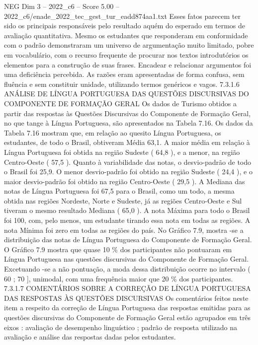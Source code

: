 \begin{textsample}{NEG Dim 3 – 2022\_c6 – Score 5.00 – 2022\_c6/enade\_2022\_tec\_gest\_tur\_eadd874aa1.txt}
Esses fatos parecem ter sido os principais responsáveis pelo resultado aquém do esperado em termos de avaliação quantitativa.
Mesmo os estudantes que responderam em conformidade com o padrão demonstraram um universo de argumentação muito limitado, pobre em vocabulário, com o recurso frequente de procurar nos textos introdutórios os elementos para a construção de suas frases.
Encadear e relacionar argumentos foi uma deficiência percebida.
As razões eram apresentadas de forma confusa, sem fluência e sem constituir unidade, utilizando termos genéricos e vagos. 7.3.1.6 ANÁLISE DE LÍNGUA PORTUGUESA DAS QUESTÕES DISCURSIVAS DO COMPONENTE DE FORMAÇÃO GERAL Os dados de Turismo obtidos a partir das respostas às Questões Discursivas do Componente de Formação Geral, no que tange à Língua Portuguesa, são apresentados na Tabela 7.16.
Os dados da Tabela 7.16 mostram que, em relação ao quesito Língua Portuguesa, os estudantes, de todo o Brasil, obtiveram Média 63,1.
A maior média em relação à Língua Portuguesa foi obtida na região Sudeste ( 64,8 ), e a menor, na região Centro-Oeste ( 57,5 ).
Quanto à variabilidade das notas, o desvio-padrão de todo o Brasil foi 25,9.
O menor desvio-padrão foi obtido na região Sudeste ( 24,4 ), e o maior desvio-padrão foi obtido na região Centro-Oeste ( 29,5 ).
A Mediana das notas de Língua Portuguesa foi 67,5 para o Brasil, como um todo, a mesma obtida nas regiões Nordeste, Norte e Sudeste, já as regiões Centro-Oeste e Sul tiveram o mesmo resultado Mediana ( 65,0 ).
A nota Máxima para todo o Brasil foi 100, com, pelo menos, um estudante tirando essa nota em todas as regiões.
A nota Mínima foi zero em todas as regiões do país.
No Gráfico 7.9, mostra -se a distribuição das notas de Língua Portuguesa do Componente de Formação Geral.
O Gráfico 7.9 mostra que quase 10 \% dos participantes não pontuaram em Língua Portuguesa nas questões discursivas do Componente de Formação Geral.
Excetuando -se a não pontuação, a moda dessa distribuição ocorre no intervalo ( 60 ; 70 ], unimodal, com uma frequência maior que 20 \% dos participantes. 7.3.1.7 COMENTÁRIOS SOBRE A CORREÇÃO DE LÍNGUA PORTUGUESA DAS RESPOSTAS ÀS QUESTÕES DISCURSIVAS Os comentários feitos neste item a respeito da correção de Língua Portuguesa das respostas emitidas para as questões discursivas do Componente de Formação Geral estão agrupados em três eixos : avaliação de desempenho linguístico ; padrão de resposta utilizado na avaliação e análise das respostas dadas pelos estudantes.

\end{textsample}

